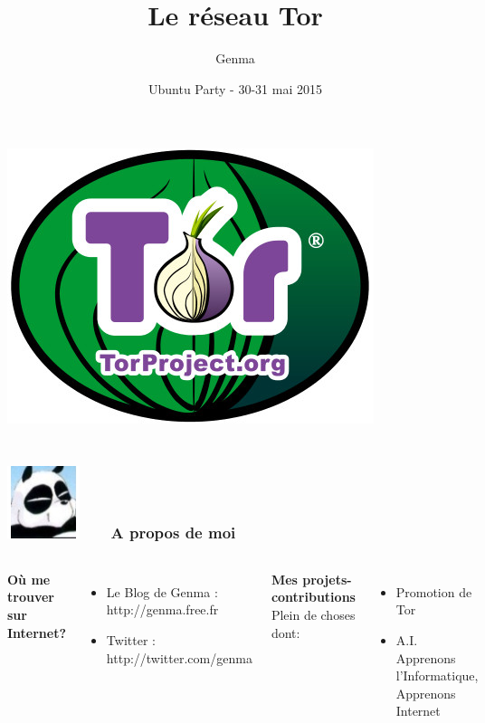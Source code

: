 \documentclass{beamer}
\title[Tor et le Tor Browser Bundle]{Le réseau Tor}
\author{Genma}
\date{Ubuntu Party - 30-31 mai 2015}
\begin{document}
\begin{frame}
	\titlepage
	\begin{center}
		\includegraphics[scale=0.2]{./images/logo_tor.jpg}
		\\		
		\\[2.5ex]
		{\tiny\CcNote{\CcLongnameByNcSa}}
		\vspace*{-2.5ex}
	\end{center}
\end{frame}

\begin{frame}
\frametitle{\includegraphics[scale=0.4]{./images/Genma.jpg} \ \ \  A propos de moi  }
\begin{columns}[c] 

\textbf{Où me trouver sur Internet?}
\begin{itemize}
\item Le Blog de Genma : http://genma.free.fr
\item Twitter : http://twitter.com/genma
\end{itemize}
\textbf{Mes projets-contributions}
\\ Plein de choses dont:
\begin{itemize}
\item Promotion de Tor
\item A.I. Apprenons l'Informatique, Apprenons Internet
\end{itemize}

\includegraphics[width=5cm,height=5cm]{./images/blog.png} 
\end{columns}
\end{frame}
\end{document}
